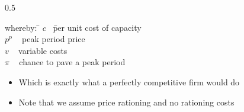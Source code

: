 \begin{frame}
\begin{columns}
\begin{column} {0.5\textwidth}
{\small
\begin{tabbing}
whereby: \= $c$ \  \= per unit cost of capacity \\
\> $p^p$   \    \> peak period price  \\
\> $v$    \   \> variable costs \\
\> $\pi$    \    \> chance to pave a peak period
\end{tabbing}}

\begin{itemize}
\item Which is exactly what a perfectly competitive firm would do
\end {itemize}

\begin{itemize}
\item Note that we assume price rationing and no rationing costs
\end {itemize}

\end{column}
\end{columns}

\end{frame}
